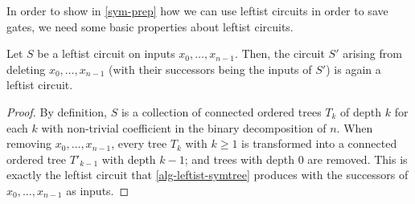 In order to show in \cref{sym-prep} how we can use leftist circuits in order to save gates,
we need some basic properties about leftist circuits.

\begin{lemma} \label{reduction-leftist}
 Let $S$ be a leftist circuit on inputs $x_0, \dotsc, x_{n-1}$.
 Then, the circuit $S'$ arising from deleting $x_0, \dotsc, x_{n-1}$
 (with their successors being the inputs of $S'$) is again a leftist circuit.
 \begin{proof}
  By definition, $S$ is a collection of connected ordered trees $T_k$ of depth $k$ for each $k$
  with non-trivial coefficient in the binary decomposition of $n$.
  When removing $x_0, \dotsc, x_{n-1}$,
  every tree $T_k$ with $k \geq 1$ is transformed into a connected ordered tree $T'_{k-1}$ with depth $k-1$;
  and trees with depth $0$ are removed.
  This is exactly the leftist circuit that \cref{alg-leftist-symtree} produces
  with the successors of $x_0, \dotsc, x_{n-1}$ as inputs.
 \end{proof}
\end{lemma}

